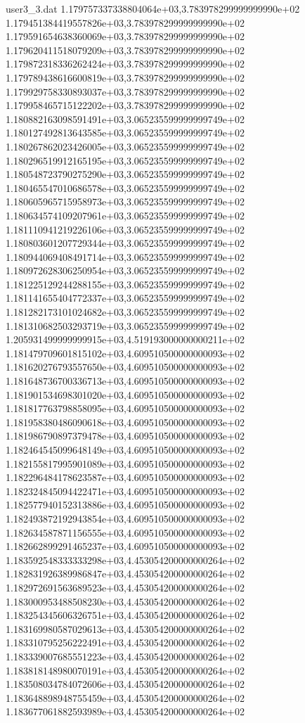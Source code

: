 \begin{filecontents}{user3_3.dat}
1.179757337338804064e+03,3.783978299999999990e+02
1.179451384419557826e+03,3.783978299999999990e+02
1.179591654638360069e+03,3.783978299999999990e+02
1.179620411518079209e+03,3.783978299999999990e+02
1.179872318336262424e+03,3.783978299999999990e+02
1.179789438616600819e+03,3.783978299999999990e+02
1.179929758330893037e+03,3.783978299999999990e+02
1.179958465715122202e+03,3.783978299999999990e+02
1.180882163098591491e+03,3.065235599999999749e+02
1.180127492813643585e+03,3.065235599999999749e+02
1.180267862023426005e+03,3.065235599999999749e+02
1.180296519912165195e+03,3.065235599999999749e+02
1.180548723790275290e+03,3.065235599999999749e+02
1.180465547010686578e+03,3.065235599999999749e+02
1.180605965715958973e+03,3.065235599999999749e+02
1.180634574109207961e+03,3.065235599999999749e+02
1.181110941219226106e+03,3.065235599999999749e+02
1.180803601207729344e+03,3.065235599999999749e+02
1.180944069408491714e+03,3.065235599999999749e+02
1.180972628306250954e+03,3.065235599999999749e+02
1.181225129244288155e+03,3.065235599999999749e+02
1.181141655404772337e+03,3.065235599999999749e+02
1.181282173101024682e+03,3.065235599999999749e+02
1.181310682503293719e+03,3.065235599999999749e+02
1.205931499999999915e+03,4.519193000000000211e+02
1.181479709601815102e+03,4.609510500000000093e+02
1.181620276793557650e+03,4.609510500000000093e+02
1.181648736700336713e+03,4.609510500000000093e+02
1.181901534698301020e+03,4.609510500000000093e+02
1.181817763798858095e+03,4.609510500000000093e+02
1.181958380486090618e+03,4.609510500000000093e+02
1.181986790897379478e+03,4.609510500000000093e+02
1.182464545099648149e+03,4.609510500000000093e+02
1.182155817995901089e+03,4.609510500000000093e+02
1.182296484178623587e+03,4.609510500000000093e+02
1.182324845094422471e+03,4.609510500000000093e+02
1.182577940152313886e+03,4.609510500000000093e+02
1.182493872192943854e+03,4.609510500000000093e+02
1.182634587871156555e+03,4.609510500000000093e+02
1.182662899291465237e+03,4.609510500000000093e+02
1.183592548333333298e+03,4.453054200000000264e+02
1.182831926389986847e+03,4.453054200000000264e+02
1.182972691563689523e+03,4.453054200000000264e+02
1.183000953488508230e+03,4.453054200000000264e+02
1.183254345606326751e+03,4.453054200000000264e+02
1.183169980587029613e+03,4.453054200000000264e+02
1.183310795256222491e+03,4.453054200000000264e+02
1.183339007685551223e+03,4.453054200000000264e+02
1.183818148980070191e+03,4.453054200000000264e+02
1.183508034784072606e+03,4.453054200000000264e+02
1.183648898948755459e+03,4.453054200000000264e+02
1.183677061882593989e+03,4.453054200000000264e+02

\end{filecontents}

